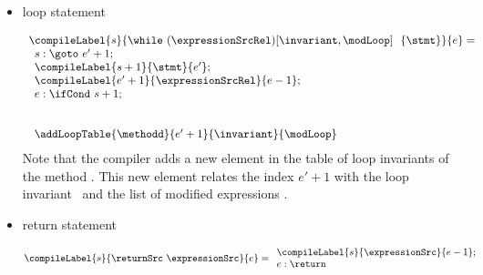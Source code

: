 \begin{itemize}
      \item loop statement

 $$\begin{array}{l} \compileLabel{s}{\while \ (\expressionSrcRel) \lbrack \invariant, \modLoop \rbrack \ \do \ \{ \stmt \} }{e} = \\
         \begin{array}{l}
              s: \goto \ e' + 1; \\
	      \compileLabel{s +  1}{\stmt}{e' }; \\
	      \compileLabel{e' +  1}{\expressionSrcRel}{e  -1 };\\
	      e: \ifCond \ s +  1; \\
	      \\\\
	      \addLoopTable{\methodd}{e'+1}{\invariant }{\modLoop}
	 \end{array}
    \end{array}
$$
Note that the compiler adds a new element in the table of loop invariants of the method \methodd. 
This new element relates  the index $e'+1$  with the loop invariant \invariant \  and the
 list of modified expressions \modLoop.



 \item return statement

 $$ \compileLabel{s}{\returnSrc  \  \expressionSrc }{e } =  
\begin{array}{l} 
\compileLabel{s}{ \expressionSrc }{e - 1};\\
 e : \return
\end{array}   $$
\end{itemize}


